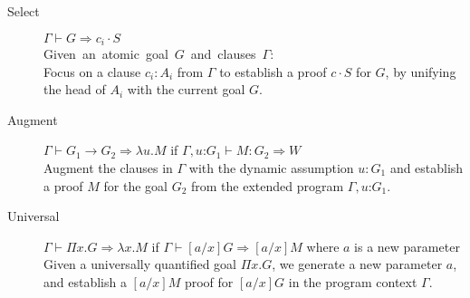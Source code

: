 \documentclass{llncs}
\newcommand{\fighead}{\hrule\vspace{1.5ex}}
\newcommand{\vd}{\vdash}
\newcommand{\arrow}{\rightarrow}
\newcommand{\oftp}{\mathord{:}}
\begin{document}

\begin{small}
\begin{description}
\item[Select] $\Gamma \vd  G \Rightarrow c_i \cdot S$ \\
    \mbox{Given an atomic goal $G$ and clauses $\Gamma$:}\hfill\\
     Focus on a clause $c_i : A_i$ from $\Gamma$ to establish a proof
     $c\cdot S$ for $G$, by unifying the head of $A_i$ with the current
     goal $G$. 

\item[Augment] $\Gamma \vd  G_1 \arrow G_2 \Rightarrow \lambda u. M$ if $\Gamma,
  u\oftp G_1 \vd M : G_2 \Rightarrow W$ \\
Augment the clauses in $\Gamma$ with the dynamic assumption $u{:} G_1$ and
establish a proof $M$ for the goal $G_2$ from the extended program
$\Gamma, u \oftp G_1$. 
\item[Universal] $\Gamma \vd  \Pi x. G \Rightarrow \lambda x. M$ if $\Gamma \vd
  [a/x]G\Rightarrow [a/x]M$ where $a$ is a new parameter\\
Given a universally quantified goal $\Pi x. G$, we generate a new parameter $a$, and establish a $[a/x]M$ proof  for $[a/x]G$ in the program context $\Gamma$.
\end{description}
\end{small}    
\end{document}
